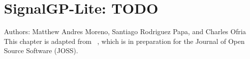 \chapter{SignalGP-Lite: TODO}
\label{ch:sgp-lite}

\noindent
Authors: Matthew Andres Moreno, Santiago Rodriguez Papa, and Charles Ofria \\
This chapter is adapted from ~\citep{moreno2021signalgp}, which is in preparation for the Journal of Open Source Software (JOSS).






